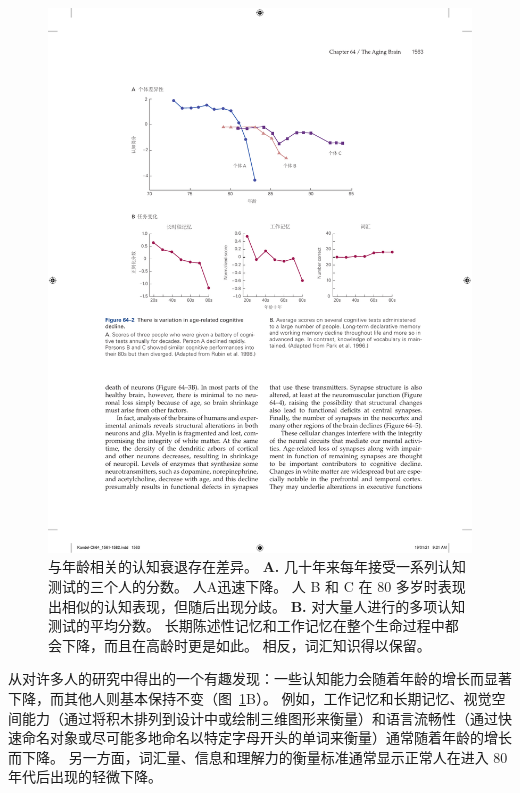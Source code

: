 \begin{figure}[htbp]
	\centering
	\includegraphics[width=1.0\linewidth]{chap64/fig_64_2}
	\caption{与年龄相关的认知衰退存在差异。
		\textbf{A.} 几十年来每年接受一系列认知测试的三个人的分数。
		人A迅速下降。
		人 B 和 C 在 80 多岁时表现出相似的认知表现，但随后出现分歧\cite{rubin1998prospective}。
		\textbf{B.} 对大量人进行的多项认知测试的平均分数。
		长期陈述性记忆和工作记忆在整个生命过程中都会下降，而且在高龄时更是如此。
		相反，词汇知识得以保留\cite{park1996mediators}。}
	\label{fig:64_2}
\end{figure}


从对许多人的研究中得出的一个有趣发现：一些认知能力会随着年龄的增长而显著下降，而其他人则基本保持不变（图~\ref{fig:64_2}B）。
例如，工作记忆和长期记忆、视觉空间能力（通过将积木排列到设计中或绘制三维图形来衡量）和语言流畅性（通过快速命名对象或尽可能多地命名以特定字母开头的单词来衡量）通常随着年龄的增长而下降。
另一方面，词汇量、信息和理解力的衡量标准通常显示正常人在进入 80 年代后出现的轻微下降。


